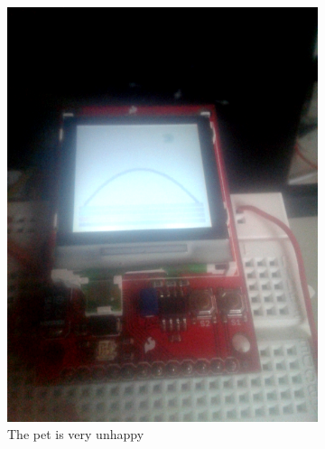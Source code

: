 \documentclass[a4paper]{article}
\begin{document}
\begin{figure}[h]
\begin{subfigure}[b]{0.3\textwidth}
    \includegraphics[width=\textwidth]{Pictures/unhappy.png}
    \caption{\label{fig:smile:unhappy} The pet is very unhappy}
  \end{subfigure}
  \begin{subfigure}[b]{0.3\textwidth}

\end{subfigure}
\end{figure}
\end{document}
